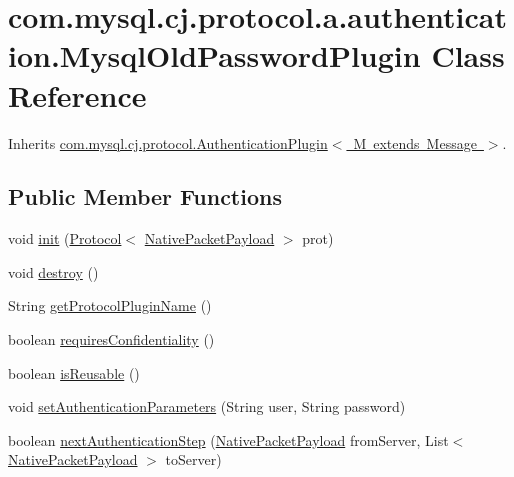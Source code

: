 \hypertarget{classcom_1_1mysql_1_1cj_1_1protocol_1_1a_1_1authentication_1_1_mysql_old_password_plugin}{}\section{com.\+mysql.\+cj.\+protocol.\+a.\+authentication.\+Mysql\+Old\+Password\+Plugin Class Reference}
\label{classcom_1_1mysql_1_1cj_1_1protocol_1_1a_1_1authentication_1_1_mysql_old_password_plugin}


Inherits \mbox{\hyperlink{interfacecom_1_1mysql_1_1cj_1_1protocol_1_1_authentication_plugin}{com.\+mysql.\+cj.\+protocol.\+Authentication\+Plugin$<$ M extends Message $>$}}.

\subsection*{Public Member Functions}
\begin{DoxyCompactItemize}
\item 
void \mbox{\hyperlink{classcom_1_1mysql_1_1cj_1_1protocol_1_1a_1_1authentication_1_1_mysql_old_password_plugin_aef57fe895bf9cb5b249c2a11100ab3c4}{init}} (\mbox{\hyperlink{interfacecom_1_1mysql_1_1cj_1_1protocol_1_1_protocol}{Protocol}}$<$ \mbox{\hyperlink{classcom_1_1mysql_1_1cj_1_1protocol_1_1a_1_1_native_packet_payload}{Native\+Packet\+Payload}} $>$ prot)
\item 
void \mbox{\hyperlink{classcom_1_1mysql_1_1cj_1_1protocol_1_1a_1_1authentication_1_1_mysql_old_password_plugin_a4f0ccfe554748824d036259089e8475d}{destroy}} ()
\item 
String \mbox{\hyperlink{classcom_1_1mysql_1_1cj_1_1protocol_1_1a_1_1authentication_1_1_mysql_old_password_plugin_aa71d4dbe9fa1ed67725f89b14fa06e72}{get\+Protocol\+Plugin\+Name}} ()
\item 
boolean \mbox{\hyperlink{classcom_1_1mysql_1_1cj_1_1protocol_1_1a_1_1authentication_1_1_mysql_old_password_plugin_a651b0a7b0418bdc2ed5c000da1046d9c}{requires\+Confidentiality}} ()
\item 
boolean \mbox{\hyperlink{classcom_1_1mysql_1_1cj_1_1protocol_1_1a_1_1authentication_1_1_mysql_old_password_plugin_a9d16dfa8345a0c98297c3e1ddd01924e}{is\+Reusable}} ()
\item 
void \mbox{\hyperlink{classcom_1_1mysql_1_1cj_1_1protocol_1_1a_1_1authentication_1_1_mysql_old_password_plugin_a0d3234b9087f06e3d10a3fe13566c6a8}{set\+Authentication\+Parameters}} (String user, String password)
\item 
boolean \mbox{\hyperlink{classcom_1_1mysql_1_1cj_1_1protocol_1_1a_1_1authentication_1_1_mysql_old_password_plugin_ada342ca352f7bbc0ec6f6d8b02e7d253}{next\+Authentication\+Step}} (\mbox{\hyperlink{classcom_1_1mysql_1_1cj_1_1protocol_1_1a_1_1_native_packet_payload}{Native\+Packet\+Payload}} from\+Server, List$<$ \mbox{\hyperlink{classcom_1_1mysql_1_1cj_1_1protocol_1_1a_1_1_native_packet_payload}{Native\+Packet\+Payload}} $>$ to\+Server)
\end{DoxyCompactItemize}


